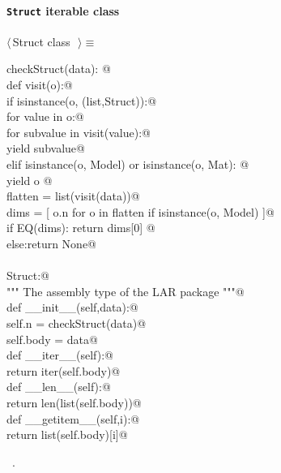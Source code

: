 \documentclass[11pt,oneside]{article}	%
\begin{document}
\paragraph{\texttt{Struct} iterable class}
\begin{flushleft} \small \label{scrap24}
$\langle\,$Struct class\nobreak\ {\footnotesize {}}$\,\rangle\equiv$
\vspace{-1ex}
\begin{list}{}{} \item
\mbox{}\verb@def checkStruct(data):  @\\
\mbox{}\verb@   def visit(o):@\\
\mbox{}\verb@       if isinstance(o, (list,Struct)):@\\
\mbox{}\verb@           for value in o:@\\
\mbox{}\verb@               for subvalue in visit(value):@\\
\mbox{}\verb@                   yield subvalue@\\
\mbox{}\verb@       elif isinstance(o, Model) or isinstance(o, Mat): @\\
\mbox{}\verb@         yield o     @\\
\mbox{}\verb@   flatten = list(visit(data))@\\
\mbox{}\verb@   dims = [ o.n for o in flatten if isinstance(o, Model) ]@\\
\mbox{}\verb@   if EQ(dims): return dims[0] @\\
\mbox{}\verb@   else:return None@\\
\mbox{}\verb@@\\
\mbox{}\verb@class Struct:@\\
\mbox{}\verb@    """ The assembly type of the LAR package """@\\
\mbox{}\verb@    def __init__(self,data):@\\
\mbox{}\verb@        self.n = checkStruct(data)@\\
\mbox{}\verb@        self.body = data@\\
\mbox{}\verb@    def __iter__(self):@\\
\mbox{}\verb@        return iter(self.body)@\\
\mbox{}\verb@    def __len__(self):@\\
\mbox{}\verb@        return len(list(self.body))@\\
\mbox{}\verb@    def __getitem__(self,i):@\\
\mbox{}\verb@        return list(self.body)[i]@\\
\mbox{}\verb@@{\NWsep}
\end{list}
\vspace{-1ex}
\footnotesize\addtolength{\baselineskip}{-1ex}
\begin{list}{}{\setlength{\itemsep}{-\parsep}\setlength{\itemindent}{-\leftmargin}}
\item \NWtxtMacroRefIn\ .
\end{list}
\end{flushleft}
\end{document}
